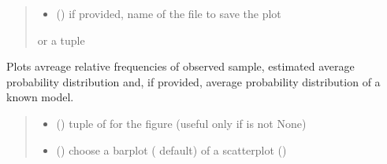 \documentclass[letterpaper,10pt,english]{sphinxmanual}
\begin{document}
\begin{fulllineitems}
\begin{fulllineitems}
\begin{quote}
\begin{description}
\begin{itemize}
\item {} 
\sphinxAtStartPar
{} () \textendash{} if provided, name of the file to save the plot

\end{itemize}

\sphinxAtStartPar
{} or a tuple 

\end{description}\end{quote}

\end{fulllineitems}


\begin{fulllineitems}
\label{\detokenize{cubmods:cubmods.cush_x.CUBresCUSHX.plot_ordinal}}
\pysigstartsignatures
{}
\pysigstopsignatures
\sphinxAtStartPar
Plots avreage relative frequencies of observed sample, estimated 
average probability distribution and,
if provided, average probability distribution of a known model.
\begin{quote}\begin{description}
\begin{itemize}
\item {} 
\sphinxAtStartPar
{} () \textendash{} tuple of  for the figure (useful only if  is not None)

\item {} 
\sphinxAtStartPar
{} () \textendash{} choose a barplot ( default) of a scatterplot ()


\end{itemize}
\end{description}
\end{quote}
\end{fulllineitems}
\end{fulllineitems}
\end{document}
